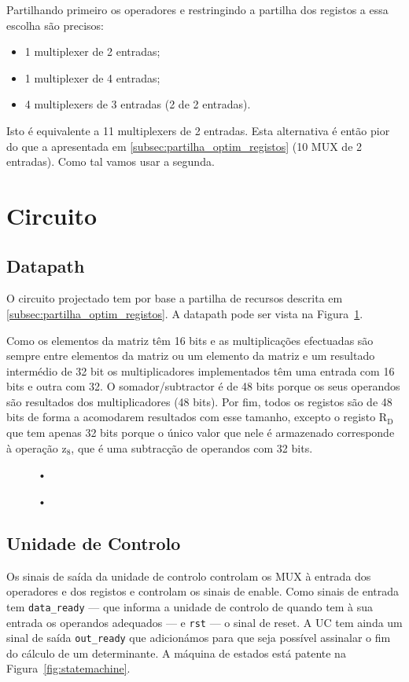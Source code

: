\documentclass[a4paper]{article}
\begin{document}
Partilhando primeiro os operadores e restringindo a partilha dos registos a essa escolha são precisos:
\begin{itemize}
	\item 1 multiplexer de 2 entradas;
	\item 1 multiplexer de 4 entradas;
	\item 4 multiplexers de 3 entradas (2 de 2 entradas).
\end{itemize}
Isto é equivalente a 11 multiplexers de 2 entradas. Esta alternativa é então pior do que a apresentada em \ref{subsec:partilha_optim_registos} (10 MUX de 2 entradas). Como tal vamos usar a segunda.

\section{Circuito}
\subsection{Datapath}

O circuito projectado tem por base a partilha de recursos descrita em \ref{subsec:partilha_optim_registos}. A datapath pode ser vista na Figura~\ref{fig:datapath_original}.

Como os elementos da matriz têm 16 bits e as multiplicações efectuadas são sempre entre elementos da matriz ou um elemento da matriz e um resultado intermédio de 32 bit os multiplicadores implementados têm uma entrada com 16 bits e outra com 32. O somador/subtractor é de 48 bits porque os seus operandos são resultados dos multiplicadores (48 bits). Por fim, todos os registos são de 48 bits de forma a acomodarem resultados com esse tamanho, excepto o registo $\mathrm{R_D}$ que tem apenas 32 bits porque o único valor que nele é armazenado corresponde à operação $\mathrm{z_8}$, que é uma subtracção de operandos com 32 bits.

\begin{figure}
	\centering
	•
	\caption{•}
	\label{fig:datapath_original}
\end{figure}

\subsection{Unidade de Controlo}

Os sinais de saída da unidade de controlo controlam os MUX à entrada dos operadores e dos registos e controlam os sinais de enable. Como sinais de entrada tem \texttt{data\_ready} --- que informa a unidade de controlo de quando tem à sua entrada os operandos adequados --- e \texttt{rst} --- o sinal de reset. A UC tem ainda um sinal de saída \texttt{out\_ready} que adicionámos para que seja possível assinalar o fim do cálculo de um determinante. A máquina de estados está patente na Figura~\ref{fig:statemachine}.
\end{document}
